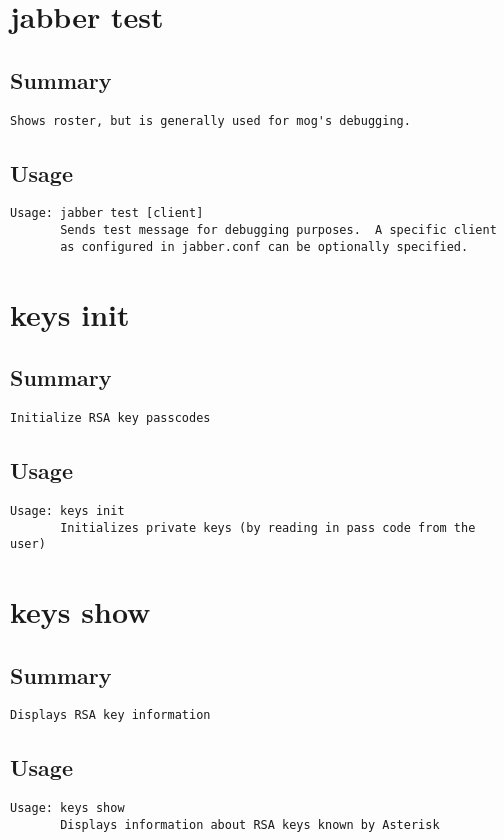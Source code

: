 \section{jabber test}
\subsection{Summary}
\begin{verbatim}
Shows roster, but is generally used for mog's debugging.
\end{verbatim}
\subsection{Usage}
\begin{verbatim}
Usage: jabber test [client]
       Sends test message for debugging purposes.  A specific client
       as configured in jabber.conf can be optionally specified.

\end{verbatim}


\section{keys init}
\subsection{Summary}
\begin{verbatim}
Initialize RSA key passcodes
\end{verbatim}
\subsection{Usage}
\begin{verbatim}
Usage: keys init
       Initializes private keys (by reading in pass code from the user)

\end{verbatim}


\section{keys show}
\subsection{Summary}
\begin{verbatim}
Displays RSA key information
\end{verbatim}
\subsection{Usage}
\begin{verbatim}
Usage: keys show
       Displays information about RSA keys known by Asterisk

\end{verbatim}



